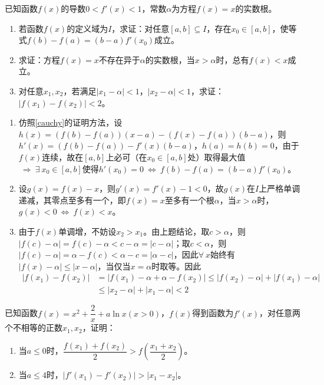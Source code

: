 \begin{que}
	已知函数$f(x)$的导数$0<f'(x)<1$，常数$\alpha$为方程$f(x)=x$的实数根。
	\begin{enumerate}
		\item 若函数$f(x)$的定义域为$I$，求证：对任意$[a,b]\subseteq I$，存在$x_0\in[a,b]$，使等式$f(b)-f(a)=(b-a)f'(x_0)$成立。
		\item 求证：方程$f(x)=x$不存在异于$\alpha$的实数根，当$x>\alpha$时，总有$f(x)<x$成立。
		\item 对任意$x_1,x_2$，若满足$|x_1-\alpha|<1$，$|x_2-\alpha|<1$，求证：$|f(x_1)-f(x_2)|<2$。
	\end{enumerate}
\end{que}
\sol \begin{enumerate}
	\item 仿照\ref{cauchy}的证明方法，设$h(x)=(f(b)-f(a))(x-a)-(f(x)-f(a))(b-a)$，则$h'(x)=(f(b)-f(a))-f'(x)(b-a)$，$h(a)=h(b)=0$，由于$f(x)$连续，故在$[a,b]$上必可（在$x_0\in[a,b]$处）取得最大值$\ \Rightarrow\ \exists\ x_0\in[a,b]$使得$h'(x_0)=0\ \Leftrightarrow\ f(b)-f(a)=(b-a)f'(x_0)$。
	\item 设$g(x)=f(x)-x$，则$g'(x)=f'(x)-1<0$，故$g(x)$在$I$上严格单调递减，其零点至多有一个，即$f(x)=x$至多有一个根$\alpha$，当$x>\alpha$时，$g(x)<0\ \Leftrightarrow\ f(x)<x$。
	\item 由于$f(x)$单调增，不妨设$x_2>x_1$。由上题结论，取$c>\alpha$，则$|f(c)-\alpha|=f(c)-\alpha<c-\alpha=|c-\alpha|$；取$c<\alpha$，则$|f(c)-\alpha|=\alpha-f(c)<\alpha-c=|\alpha-c|$，因此$\forall\ x$始终有$|f(x)-\alpha|\leqslant |x-\alpha|$，当仅当$x=\alpha$时取等。因此$$\begin{aligned}
	|f(x_1)-f(x_2)|&=|f(x_1)-\alpha+\alpha-f(x_2)|\leqslant|f(x_2)-\alpha|+|f(x_1)-\alpha|\\&\leqslant|x_2-\alpha|+|x_1-\alpha|<2
	\end{aligned}$$
\end{enumerate}\par\hfill{}\easy

\begin{que}
	已知函数$f(x)=x^2+\dfrac{2}{x}+a\ln x(x>0)$，$f(x)$得到函数为$f'(x)$，对任意两个不相等的正数$x_1,x_2$，证明：\begin{enumerate}
		\item 当$a\leqslant 0$时，$\dfrac{f(x_1)+f(x_2)}{2}>f\left(\dfrac{x_1+x_2}{2}\right)$。
		\item 当$a\leqslant 4$时，$|f'(x_1)-f'(x_2)|>|x_1-x_2|$。
	\end{enumerate}
\end{que}\par\hfill\easy
\par\par

